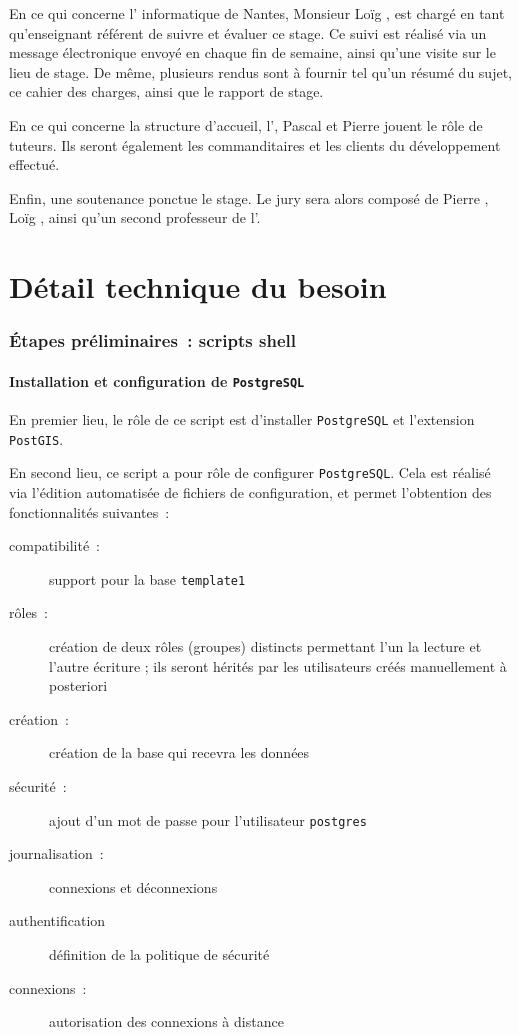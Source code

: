 \documentclass[french,12pt]{article}
\begin{document}
En ce qui concerne l' informatique de Nantes, Monsieur Loïg , est chargé en tant qu'enseignant référent de suivre et évaluer ce stage. Ce suivi est réalisé via un message électronique envoyé en chaque fin de semaine, ainsi qu'une visite sur le lieu de stage. De même, plusieurs rendus sont à fournir tel qu'un résumé du sujet, ce cahier des charges, ainsi que le rapport de stage.

En ce qui concerne la structure d'accueil, l', Pascal  et Pierre  jouent le rôle de tuteurs. Ils seront également les commanditaires et les clients du développement effectué.

Enfin, une soutenance ponctue le stage. Le jury sera alors composé de Pierre , Loïg , ainsi qu'un second professeur de l'.

\part{Détail technique du besoin}

\section{Étapes préliminaires~: scripts shell}

\subsection{Installation et configuration de \texttt{PostgreSQL}}

En premier lieu, le rôle de ce script est d'installer \texttt{PostgreSQL} et l'extension \texttt{PostGIS}.

En second lieu, ce script a pour rôle de configurer \texttt{PostgreSQL}. Cela est réalisé via l'édition automatisée de fichiers de configuration, et permet l'obtention des fonctionnalités suivantes~:

\begin{description}
  \item[compatibilité~:] support  pour la base \texttt{template1}
  \item[rôles~:] création de deux rôles (groupes) distincts permettant l'un la lecture et l'autre écriture ; ils seront hérités par les utilisateurs créés manuellement à posteriori
  \item[création~:] création de la base qui recevra les données
  \item[sécurité~:] ajout d'un mot de passe pour l'utilisateur \texttt{postgres}
  \item[journalisation~:] connexions et déconnexions
  \item[authentification] définition de la politique de sécurité
  \item[connexions~:] autorisation des connexions à distance
\end{description}
\end{document}
